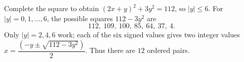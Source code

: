 Complete the square to obtain $(2x+y)^2+3y^2=112$, so $|y|\le6$. For $|y|=0,1,\ldots,6$, the possible squares $112-3y^2$ are
\[
112,\ 109,\ 100,\ 85,\ 64,\ 37,\ 4.
\]
Only $|y|=2,4,6$ work; each of the six signed values gives two integer values $x=\dfrac{(-y\pm\sqrt{112-3y^2})}{2}$. Thus there are $\boxed{12}$ ordered pairs.
